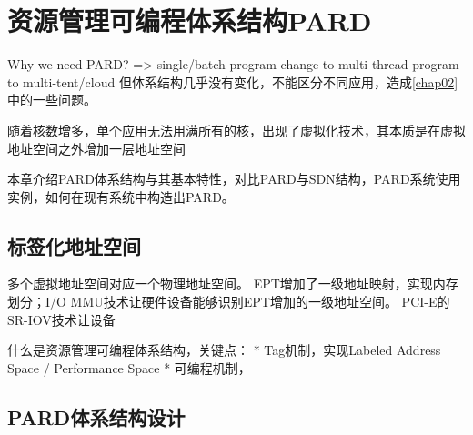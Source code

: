 

\chapter{资源管理可编程体系结构PARD}
\label{chap:pardarch}

Why we need PARD? => single/batch-program change to multi-thread program to multi-tent/cloud
但体系结构几乎没有变化，不能区分不同应用，造成\ref{chap02}中的一些问题。

随着核数增多，单个应用无法用满所有的核，出现了虚拟化技术，其本质是在虚拟地址空间之外增加一层地址空间

本章介绍PARD体系结构与其基本特性，对比PARD与SDN结构，PARD系统使用实例，如何在现有系统中构造出PARD。

\section{标签化地址空间}


多个虚拟地址空间对应一个物理地址空间。
EPT增加了一级地址映射，实现内存划分；I/O MMU技术让硬件设备能够识别EPT增加的一级地址空间。
PCI-E的SR-IOV技术让设备

什么是资源管理可编程体系结构，关键点：
 * Tag机制，实现Labeled Address Space / Performance Space
 * 可编程机制，



\section{PARD体系结构设计}


